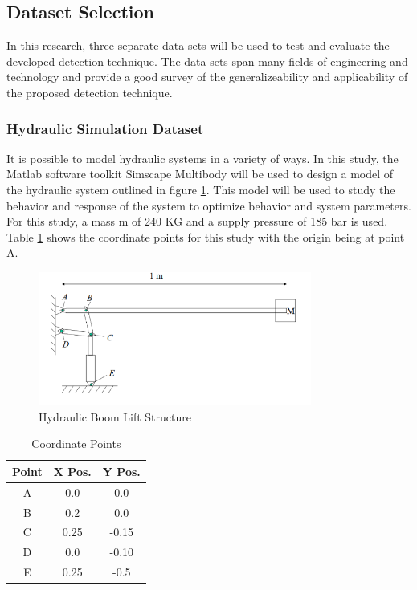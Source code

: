 \subsection{Dataset Selection}
\label{ref_datasets}

In this research, three separate data sets will be used to test and evaluate the developed detection technique. The data sets span many fields of engineering and technology and provide a good survey of the generalizeability and applicability of the proposed detection technique.  

\subsubsection{Hydraulic Simulation Dataset}
\label{ref_hydraulic_dataset}

It is possible to model hydraulic systems in a variety of ways. In this study, the Matlab software toolkit Simscape Multibody will be used to design a model of the hydraulic system outlined in figure \ref{fig:boom_structure}. This model will be used to study the behavior and response of the system to optimize behavior and system parameters. For this study, a mass m of 240 KG and a supply pressure of 185 bar is used. Table \ref{tab:points} shows the coordinate points for this study with the origin being at point A.

 \begin{figure}[H]
    \centering
    \includegraphics[width=0.8\textwidth]{1_hydraulic_sim/BoomStructure.PNG}
    \caption{Hydraulic Boom Lift Structure}
    \label{fig:boom_structure}
 \end{figure}
 
 \begin{table}[H]
\centering
\begin{tabular}{||c c c ||} 
 \hline
 Point & X Pos. & Y Pos. \\ [0.5ex] 
 \hline\hline
 A & 0.0 & 0.0 \\
 B & 0.2 & 0.0 \\
 C & 0.25 & -0.15 \\
 D & 0.0 & -0.10 \\
 E & 0.25 & -0.5 \\ [1ex] 
 \hline
\end{tabular}
\caption{Coordinate Points}
\label{tab:points}
\end{table}

